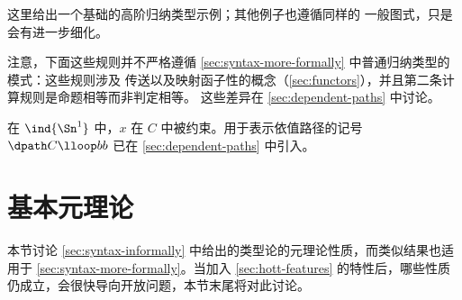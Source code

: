 %

这里给出一个基础的高阶归纳类型示例；其他例子也遵循同样的
一般图式，只是会有进一步细化。

注意，下面这些规则并不严格遵循
\cref{sec:syntax-more-formally} 中普通归纳类型的模式：这些规则涉及
传送以及映射函子性的概念（\cref{sec:functors}），并且第二条计算规则是命题相等而非判定相等。
这些差异在 \cref{sec:dependent-paths} 中讨论。

%
在 $\ind{\Sn^1}$ 中，$x$ 在 $C$ 中被约束。用于表示依值路径的记号 ${\dpath C \lloop b b}$ 已在 \cref{sec:dependent-paths} 中引入。
%
\section{基本元理论}
%

本节讨论 \cref{sec:syntax-informally} 中给出的类型论的元理论性质，而类似结果也适用于 \cref{sec:syntax-more-formally}。当加入 \cref{sec:hott-features} 的特性后，哪些性质仍成立，会很快导向开放问题，本节末尾将对此讨论。

